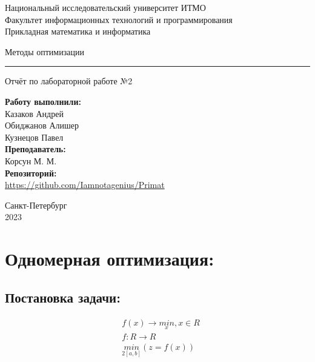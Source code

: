 \documentclass[fleqn]{article}
\begin{document}
    \begin{center}
    Национальный исследовательский университет ИТМО \\
    Факультет информационных технологий и программирования \\
    Прикладная математика и информатика
\end{center}
\vspace{20em}
\begin{center}
    {\Large Методы оптимизации}
    \vspace{3pt}
    \hrule
    \vspace{3pt}
    Отчёт по лабораторной работе №2
\end{center}
\vspace{20em}
\begin{flushright}
    \textbf{ Работу выполнили: } \\
    Казаков Андрей \\
    Обиджанов Алишер \\
    Кузнецов Павел \\

    \vspace{1em}
    \textbf{ Преподаватель: } \\
    Корсун М. М.\\

    \vspace{1em}
    \textbf{ Репозиторий: }\\
    \url{https://github.com/Iamnotagenius/Primat}
\end{flushright}
\vspace{10em}
\begin{center}
    Санкт-Петербург \\
    2023
\end{center}

\newpage

\section*{Одномерная оптимизация:}
\subsection{Постановка задачи:}
\begin{align*}
    &f(x) \rightarrow \underset{x}{min}, x \in R\\
    &f: R \rightarrow R\\
    &\underset{2[a,b]}{min}(z=f(x))
\end{align*}
\end{document}
